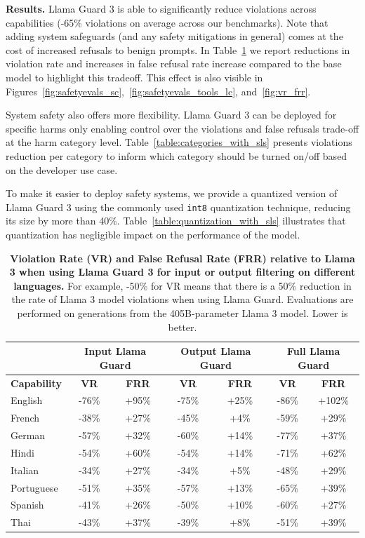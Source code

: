 \documentclass[dvipsnames]{fairmeta}
\begin{document}
\textbf{Results.} 
Llama Guard 3 is able to significantly reduce violations across capabilities (-65\% violations on average across our benchmarks). Note that adding system safeguards (and any safety mitigations in general) comes at the cost of increased refusals to benign prompts. In Table~\ref{table:capabilities_with_sls} we report reductions in violation rate and increases in false refusal rate increase compared to the base model to highlight this tradeoff.  This effect is also visible in Figures~\ref{fig:safetyevals_sc},~\ref{fig:safetyevals_tools_lc}, and~\ref{fig:vr_frr}.

System safety also offers more flexibility. Llama Guard 3 can be deployed for specific harms only enabling control over the violations and false refusals trade-off at the harm category level. Table~\ref{table:categories_with_sls} presents violations reduction per category to inform which category should be turned on/off based on the developer use case.

To make it easier to deploy safety systems, we provide a quantized version of Llama Guard 3 using the commonly used \texttt{int8} quantization technique, reducing its size by more than 40\%. Table~\ref{table:quantization_with_sls} illustrates that quantization has negligible impact on the performance of the model.

\begin{table}[t]
\centering
    \begin{tabular}{lcccccc}
    \toprule
    & \multicolumn{2}{c}{\textbf{Input Llama Guard}}  &  \multicolumn{2}{c}{\textbf{Output Llama Guard}} &  \multicolumn{2}{c}{\textbf{Full Llama Guard}}  \\
    \midrule
    \textbf{Capability} & \textbf{VR} & \textbf{FRR} & \textbf{VR} & \textbf{FRR} & \textbf{VR} & \textbf{FRR} \\ 
     \midrule
    English & -76\% & +95\% & -75\% & +25\% & -86\% & +102\% \\
    French & -38\% & +27\% & -45\% & +4\% & -59\% & +29\% \\
    German & -57\% & +32\% & -60\% & +14\% & -77\% & +37\% \\
    Hindi & -54\% & +60\% & -54\% & +14\% & -71\% & +62\% \\
    Italian & -34\% & +27\% & -34\% & +5\% & -48\% & +29\% \\
    Portuguese & -51\% & +35\% & -57\% & +13\% & -65\% & +39\% \\
    Spanish & -41\% & +26\% & -50\% & +10\% & -60\% & +27\% \\
    Thai & -43\% & +37\% & -39\% & +8\% & -51\% & +39\% \\
    \bottomrule
    \end{tabular}
    \caption{\textbf{Violation Rate (VR) and False Refusal Rate (FRR) relative to Llama 3 when using Llama Guard 3 for input or output filtering on different languages.} 
    For example, -50\% for VR means that there is a 50\% reduction in the rate of Llama 3 model violations when using Llama Guard.
    Evaluations are performed on generations from the 405B-parameter Llama 3 model. Lower is better.}
    \label{table:capabilities_with_sls}
\end{table}
\end{document}
